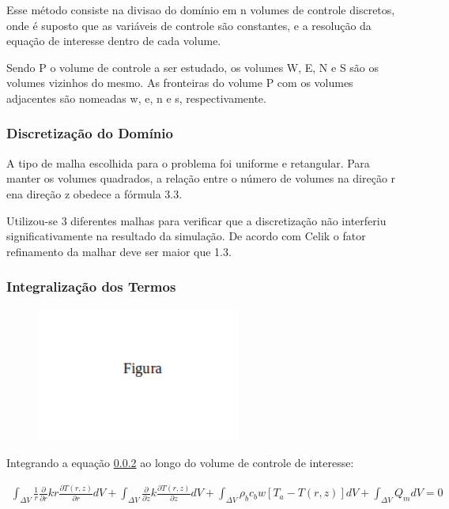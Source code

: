 \documentclass[
	12pt,				%
	openright,			%
	oneside,			%
	a4paper,			%
	english,			%
	french,				%
	spanish,			%
	brazil				%
	]{abntex2}
\begin{document}
Esse método consiste na divisao do domínio em n volumes de controle discretos, onde é suposto que as variáveis de controle são constantes, e a resolução da equação de interesse dentro de cada volume.

Sendo P o volume de controle a ser estudado, os volumes W, E, N e S são os volumes vizinhos do mesmo. As fronteiras do volume P com os volumes adjacentes são nomeadas w, e, n e s, respectivamente.


\subsubsection{Discretização do Domínio}

A tipo de malha escolhida para o problema foi uniforme e retangular. Para manter os
volumes quadrados, a relação entre o número de volumes na direção r ena direção z obedece a fórmula 3.3.

Utilizou-se 3 diferentes malhas para verificar que a discretização não interferiu significativamente na resultado da simulação. 
De acordo com Celik o fator refinamento da malhar deve ser maior que 1.3.

\subsubsection{Integralização dos 
Termos}



\begin{figure}[h!]
	\centering
	\includegraphics[width=0.6\textwidth]{Fig.png}
	\caption{ \label{fig:geometria}}
\end{figure}

Integrando a equação \ref{} ao longo do volume de controle de interesse:


\begin{gather}
\int_{\Delta V}\frac{1}{r}\frac{\partial}{\partial r}k r \frac{\partial T(r,z)}{\partial r}dV
+\int_{\Delta V} \frac{\partial}{\partial z}k\frac{\partial T(r,z)}{\partial z} dV
+\int_{\Delta V}\rho_b c_b w [T_a-T(r,z)]dV
+\int_{\Delta V} Q_m dV=0
\end{gather}
\end{document}

